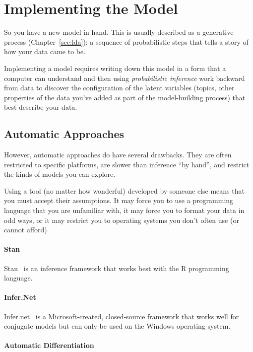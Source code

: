 \section{Implementing the Model}

So you have a new model in hand.  This is usually described as a
generative process (Chapter~\ref{sec:lda}): a sequence of probabilistic steps
that tells a story of how your data came to be.

Implementing a model requires writing down this model in a form that a
computer can understand and then using \emph{probabilistic inference}
work backward from data to discover the configuration of the latent
variables (topics, other properties of the data you've added as part
of the model-building process) that best describe your data.

\subsection{Automatic Approaches}

However, automatic approaches do have several drawbacks.  They are
often restricted to specific platforms, are slower than inference ``by
hand'', and restrict the kinds of models you can explore.

Using a tool (no matter how wonderful) developed by someone else means
that you must accept their assumptions.  It may force you to use a
programming language that you are unfamiliar with, it may force you to
format your data in odd ways, or it may restrict you to operating
systems you don't often use (or cannot afford).


\paragraph{Stan}

Stan~\citep{stan} is an inference framework that works best with the R programming
language.

\paragraph{Infer.Net}

Infer.net~\citep{InferNET14} is a Microsoft-created, closed-source framework that works well for conjugate
models but can only be used on the Windows operating system.

\paragraph{Automatic Differentiation}

